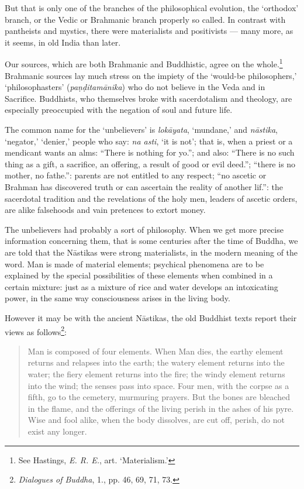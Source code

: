\documentclass[a4paper, 11pt, oneside, english, landscape]{article}
\begin{document}
But that is only one of the branches of the philosophical evolution, the `orthodox' branch, or the Vedic or Brahmanic branch properly so called. In contrast with pantheists and mystics, there were materialists and positivists --- many more, as it seems, in old India than later.

Our sources, which are both Brahmanic and Buddhistic, agree on the whole.\footnote{See Hastings, \emph{E. R. E.}, art. `Materialism.'} Brahmanic sources lay much stress on the impiety of the `would-be philosophers,' `philosophasters' (\emph{paṇḍitamānika}) who do not believe in the Veda and in Sacrifice. Buddhists, who themselves broke with sacerdotalism and theology, are especially preoccupied with the negation of soul and future life.

The common name for the `unbelievers' is \emph{lokāyata}, `mundane,' and \emph{nāstika}, `negator,' `denier,' people who say: \emph{na asti}, `it is not'; that is, when a priest or a mendicant wants an alms: ``There is nothing for yo.''; and also: ``There is no such thing as a gift, a sacrifice, an offering, a result of good or evil deed.''; ``there is no mother, no fathe.'': parents are not entitled to any respect; ``no ascetic or Brahman has discovered truth or can ascertain the reality of another lif.'': the sacerdotal tradition and the revelations of the holy men, leaders of ascetic orders, are alike falsehoods and vain pretences to extort money.

The unbelievers had probably a sort of philosophy. When we get more precise information concerning them, that is some centuries after the time of Buddha, we are told that the Nāstikas were strong materialists, in the modern meaning of the word. Man is made of material elements; psychical phenomena are to be explained by the special possibilities of these elements when combined in a certain mixture: just as a mixture of rice and water develops an intoxicating power, in the same way consciousness arises in the living body.

However it may be with the ancient Nāstikas, the old Buddhist texts report their views as follows\footnote{\emph{Dialogues of Buddha}, 1., pp. 46, 69, 71, 73.}:
\begin{quotation}
\small
Man is composed of four elements. When Man dies, the earthy element returns and relapses into the earth; the watery element returns into the water; the fiery element returns into the fire; the windy element returns into the wind; the senses pass into space. Four men, with the corpse as a fifth, go to the cemetery, murmuring prayers. But the bones are bleached in the flame, and the offerings of the living perish in the ashes of his pyre. Wise and fool alike, when the body dissolves, are cut off, perish, do not exist any longer.
\end{quotation}
\end{document}
